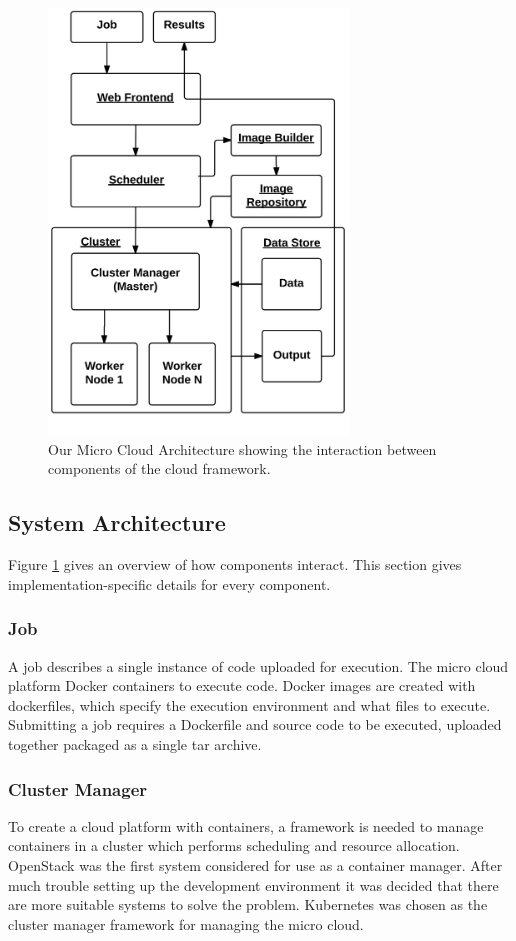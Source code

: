 \documentclass{sig-alternate-05-2015}
\begin{document}
\begin{figure}[h]
\includegraphics[width=8cm]{img/microcloud_architecture}
\caption{Our Micro Cloud Architecture showing the interaction between components of the cloud framework.}
\label{fig:architecture}
\end{figure}

\subsection{System Architecture}
Figure \ref{fig:architecture} gives an overview of how components interact. This section gives implementation-specific details for every component.

\subsubsection{Job}
A job describes a single instance of code uploaded for execution. 
The micro cloud platform Docker containers to execute code. Docker images are created with dockerfiles, which specify the execution environment and what files to execute. Submitting a job requires a Dockerfile and source code to be executed, uploaded together packaged as a single tar archive.  

\subsubsection{Cluster Manager}
To create a cloud platform with containers, a framework is needed to manage containers in a cluster which performs scheduling and resource allocation. OpenStack was the first system considered for use as a container manager. After much trouble setting up the development environment it was decided that there are more suitable systems to solve the problem. Kubernetes was chosen as the cluster manager framework for managing the micro cloud. 
\end{document}
